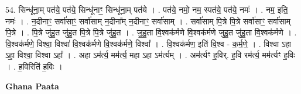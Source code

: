 \documentclass[17pt]{extarticle}
\begin{document}
54. सिन्धू॑ना॒म् पत॑ये॒ पत॑ये॒ सिन्धू॑नाꣳ॒॒ सिन्धू॑ना॒म् पत॑ये । . पत॑ये॒ नमो॒ नम॒ स्पत॑ये॒ पत॑ये॒ नमः॑ । . नम॒ इति॒ नमः॑ । . न॒दीनाꣳ॒॒ सर्वा॑साꣳ॒॒ सर्वा॑साम् न॒दीना᳚म् न॒दीनाꣳ॒॒ सर्वा॑साम् । . सर्वा॑साम् पि॒त्रे पि॒त्रे सर्वा॑साꣳ॒॒ सर्वा॑साम् पि॒त्रे । . पि॒त्रे जु॑हु॒त जु॑हु॒त पि॒त्रे पि॒त्रे जु॑हु॒त । . जु॒हु॒ता वि॒श्वक॑र्मणे वि॒श्वक॑र्मणे जुहु॒त जु॑हु॒ता वि॒श्वक॑र्मणे । . वि॒श्वक॑र्मणे॒ विश्वा॒ विश्वा॑ वि॒श्वक॑र्मणे वि॒श्वक॑र्मणे॒ विश्वा᳚ । . वि॒श्वक॑र्मण॒ इति॑ वि॒श्व - क॒र्म॒णे॒ । . विश्वा ऽहा ऽहा॒ विश्वा॒ विश्वा ऽहा᳚ । . अहा ऽम॑र्त्य॒ मम॑र्त्य॒ महा ऽहा ऽम॑र्त्यम् । . अम॑र्त्यꣳ ह॒विर्. ह॒वि रम॑र्त्य॒ मम॑र्त्यꣳ ह॒विः । . ह॒विरिति॑ ह॒विः । \newline

\textbf{Ghana Paata } \newline
\end{document}

